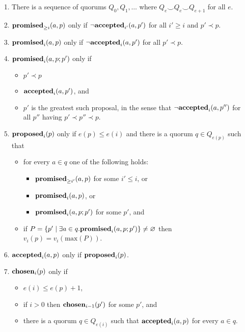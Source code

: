 \documentclass[journal]{IEEEtran}
\begin{document}
\begin{enumerate}

\item\label{paxos-quorums} There is a sequence of quorums $Q_0, Q_1, \ldots$
where ${Q_e \smile Q_e \smile Q_{e+1}}$ for all $e$.

\item\label{paxos-mprom} $\mathbf{promised}_{\ge i}(a,p)$ only if $\neg\mathbf{accepted}_{i'}(a,p')$ for all
$i' \ge i$ and $p' \prec p$.

\item\label{paxos-fprom} $\mathbf{promised}_{i}(a,p)$ only if $\neg\mathbf{accepted}_{i}(a,p')$ for all
$p' \prec p$.

\item\label{paxos-bprom} $\mathbf{promised}_{i}(a,p;p')$ only if \begin{itemize} \item
$p' \prec p$ \item $\mathbf{accepted}_{i}(a,p')$, and \item $p'$ is the greatest such
proposal, in the sense that $\neg \mathbf{accepted}_{i}(a,p'')$ for all $p''$ having $p'
\prec p'' \prec p$. \end{itemize}

\item\label{paxos-prop} $\mathbf{proposed}_{i}(p)$ only if $e(p) \le e(i)$ and there is a
quorum $q \in Q_{e(p)}$ such that
\begin{itemize}
\item for every $a \in q$ one of the following holds:
%
\begin{itemize}
\item $\mathbf{promised}_{\ge i'}(a,p)$ for some $i' \le i$, or
\item $\mathbf{promised}_{i}(a,p)$, or
\item $\mathbf{promised}_{i}(a,p;p')$ for some $p'$, and
\end{itemize}

\item if $P = \{ p' \mid \exists a \in q. \mathbf{promised}_{i}(a,p;p') \}
\ne \varnothing$ then $v_i(p) = v_i(\mathrm{max}(P))$.
\end{itemize}

\item \label{paxos-acc} $\mathbf{accepted}_{i}(a,p)$ only if $\mathbf{proposed}_{i}(p)$.

\item \label{paxos-chosen} $\mathbf{chosen}_{i}(p)$ only if
\begin{itemize}
\item $e(i) \le e(p) + 1$,
\item if $i > 0$ then $\mathbf{chosen}_{i-1}(p')$ for some $p'$, and
\item there is a quorum $q \in
Q_{e(i)}$ such that $\mathbf{accepted}_{i}(a,p)$ for every $a \in q$.
\end{itemize}

\end{enumerate}
\end{document}

